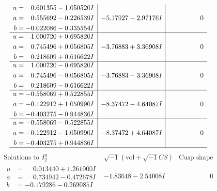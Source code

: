 \documentclass[1p]{elsarticle_modified}
\theoremstyle{definition}
\newcommand{\I}{\sqrt{-1}}
\begin{document}
$$\begin{array}{c|c|c}
\begin{aligned}
u &= \phantom{-}0.601355 - 1.050520 I \\
a &= \phantom{-}0.555692 - 0.226539 I \\
b &= -0.022086 - 0.335554 I\end{aligned}
 & -5.17927 - 2.97176 I & \phantom{-0.000000 } 0 \\ \hline\begin{aligned}
u &= \phantom{-}1.000720 + 0.695820 I \\
a &= \phantom{-}0.745496 + 0.056805 I \\
b &= \phantom{-}0.218609 + 0.616622 I\end{aligned}
 & -3.76883 + 3.36908 I & \phantom{-0.000000 } 0 \\ \hline\begin{aligned}
u &= \phantom{-}1.000720 - 0.695820 I \\
a &= \phantom{-}0.745496 - 0.056805 I \\
b &= \phantom{-}0.218609 - 0.616622 I\end{aligned}
 & -3.76883 - 3.36908 I & \phantom{-0.000000 } 0 \\ \hline\begin{aligned}
u &= -0.558069 + 0.522855 I \\
a &= -0.122912 + 1.050990 I \\
b &= -0.403275 - 0.944836 I\end{aligned}
 & -8.37472 - 4.64087 I & \phantom{-0.000000 } 0 \\ \hline\begin{aligned}
u &= -0.558069 - 0.522855 I \\
a &= -0.122912 - 1.050990 I \\
b &= -0.403275 + 0.944836 I\end{aligned}
 & -8.37472 + 4.64087 I & \phantom{-0.000000 } 0\\
 \hline 
 \end{array}$$\newpage$$\begin{array}{c|c|c}  
\text{Solutions to }I^u_{2}& \I (\text{vol} + \sqrt{-1}CS) & \text{Cusp shape}\\
 \hline 
\begin{aligned}
u &= \phantom{-}0.013440 + 1.261000 I \\
a &= \phantom{-}0.734942 - 0.472678 I \\
b &= -0.179286 - 0.269085 I\end{aligned}
 & -1.83648 - 2.54008 I & \phantom{-0.000000 } 0 \\ \hline\begin{aligned}

\end{aligned}
\end{array}$$
\end{document}
